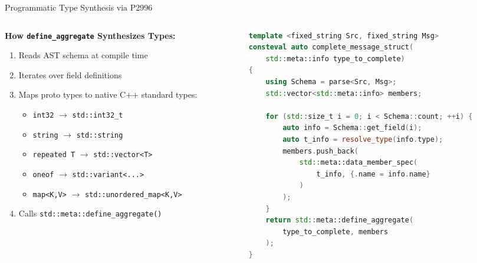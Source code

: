 \documentclass[aspectratio=169,10pt]{beamer}
\begin{document}
\begin{frame}[fragile]{Programmatic Type Synthesis via P2996}
  \begin{columns}[T]
    \begin{column}{0.50\textwidth}
      \textbf{How \texttt{define\_aggregate} Synthesizes Types:}
      \begin{enumerate}
        \item Reads AST schema at compile time
        \item Iterates over field definitions
        \item Maps proto types to native C++ standard types:
          \begin{itemize}
            \item \texttt{int32} $\rightarrow$ \texttt{std::int32\_t}
            \item \texttt{string} $\rightarrow$ \texttt{std::string}
            \item \texttt{repeated T} $\rightarrow$ \texttt{std::vector<T>}
            \item \texttt{oneof} $\rightarrow$ \texttt{std::variant<...>}
            \item \texttt{map<K,V>} $\rightarrow$ \texttt{std::unordered\_map<K,V>}
          \end{itemize}
        \item Calls \texttt{std::meta::define\_aggregate()}
      \end{enumerate}
    \end{column}

    \begin{column}{0.48\textwidth}
      \begin{lstlisting}[language=C++]
template <fixed_string Src, fixed_string Msg>
consteval auto complete_message_struct(
    std::meta::info type_to_complete) 
{
    using Schema = parse<Src, Msg>;
    std::vector<std::meta::info> members;

    for (std::size_t i = 0; i < Schema::count; ++i) {
        auto info = Schema::get_field(i);
        auto t_info = resolve_type(info.type);
        members.push_back(
            std::meta::data_member_spec(
                t_info, {.name = info.name}
            )
        );
    }
    return std::meta::define_aggregate(
        type_to_complete, members
    );
}
      \end{lstlisting}
    \end{column}
  \end{columns}
\end{frame}
\end{document}
